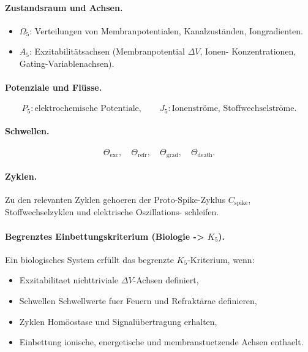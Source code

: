 \paragraph{Zustandsraum und Achsen.}
\begin{itemize}
  \item \(\Omega_5\): Verteilungen von Membranpotentialen, Kanalzuständen,
        Iongradienten.
  \item \(A_5\): Exzitabilitätsachsen (Membranpotential \(\Delta V\), Ionen-
        Konzentrationen, Gating-Variablenachsen).
\end{itemize}

\paragraph{Potenziale und Flüsse.}
\[
  P_5: \text{elektrochemische Potentiale},\qquad
  J_5: \text{Ionenströme, Stoffwechselströme}.
\]

\paragraph{Schwellen.}
\[
  \Theta_{\mathrm{exc}},\quad
  \Theta_{\mathrm{refr}},\quad
  \Theta_{\mathrm{grad}},\quad
  \Theta_{\mathrm{death}}.
\]

\paragraph{Zyklen.}
Zu den relevanten Zyklen gehoeren der Proto-Spike-Zyklus
\(C_{\mathrm{spike}}\), Stoffwechselzyklen und elektrische Oszillations-
schleifen.

\paragraph{Begrenztes Einbettungskriterium (Biologie -> \texorpdfstring{\(K_5\)}{K5}).}
Ein biologisches System erfüllt das begrenzte \(K_5\)-Kriterium, wenn:
\begin{itemize}
  \item Exzitabilitaet nichttriviale \(\Delta V\)-Achsen definiert,
  \item Schwellen Schwellwerte fuer Feuern und Refraktärae definieren,
  \item Zyklen Homöostase und Signalübertragung erhalten,
  \item Einbettung ionische, energetische und membranstuetzende Achsen enthaelt.
\end{itemize}

